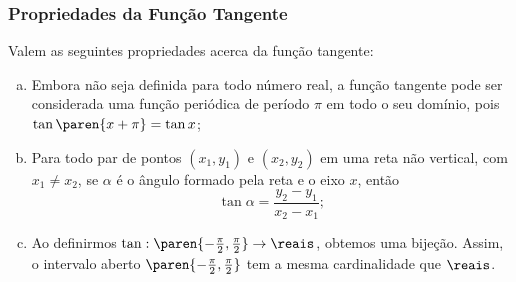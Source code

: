 \subsubsection{Propriedades da Função Tangente}

\begin{proposition}
    Valem as seguintes propriedades acerca da função tangente:

\begin{enumerate}[(a)]
  \item Embora não seja definida para todo número real, a função
  tangente pode ser considerada uma função periódica de período
  $\pi$ em todo o seu domínio, pois $\tan \paren{x+\pi} = \tan x$;
  \item Para todo par de pontos  $(x_1, y_1)$ e $(x_2, y_2)$ em uma reta não vertical, com $x_1 \neq x_2$, se
  $\alpha$ é o ângulo formado pela reta e o eixo $x$, então $$\tan
  \alpha = \frac {y_2 - y_1} {x_2 - x_1};$$
  \item Ao definirmos $\tan: \paren{- \frac {\pi} 2, \frac {\pi} 2} \to \reais$,
obtemos uma bijeção. Assim, o intervalo aberto $\paren{- \frac {\pi}
2, \frac {\pi} 2}$ tem a mesma cardinalidade que $\reais$.
\end{enumerate}
\end{proposition}


